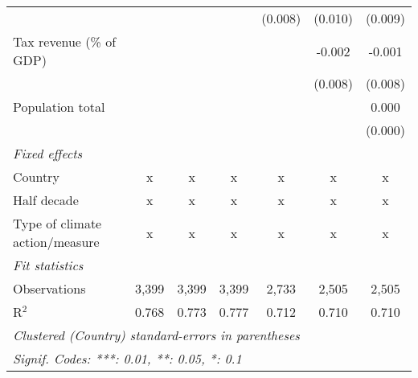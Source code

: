 \begin{tabular}{lcccccc}
                                                        &         &               &               & (0.008)        & (0.010)        & (0.009)\\   
   Tax revenue (\% of GDP)                              &         &               &               &                & -0.002         & -0.001\\   
                                                        &         &               &               &                & (0.008)        & (0.008)\\   
   Population total                                     &         &               &               &                &                & 0.000\\   
                                                        &         &               &               &                &                & (0.000)\\   
   \emph{Fixed effects}\\
   Country                                              & x       & x             & x             & x              & x              & x\\  
   Half decade                                          & x       & x             & x             & x              & x              & x\\  
   Type of climate action/measure                       & x       & x             & x             & x              & x              & x\\  
   \midrule \emph{Fit statistics}\\
   Observations                                         & 3,399   & 3,399         & 3,399         & 2,733          & 2,505          & 2,505\\  
   R$^2$                                                & 0.768   & 0.773         & 0.777         & 0.712          & 0.710          & 0.710\\  
   \midrule
   \multicolumn{7}{l}{\emph{Clustered (Country) standard-errors in parentheses}}\\
   \multicolumn{7}{l}{\emph{Signif. Codes: ***: 0.01, **: 0.05, *: 0.1}}\\
\end{tabular}
\par\endgroup


